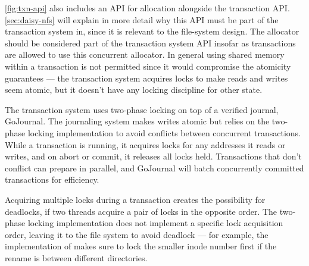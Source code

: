 \autoref{fig:txn-api} also includes an API for allocation alongside the
transaction API. \autoref{sec:daisy-nfs} will explain in more detail why this
API must be part of the transaction system in, since it is relevant to the
file-system design. The allocator should be considered part of the transaction
system API insofar as transactions are allowed to use this concurrent allocator.
In general using shared memory within a transaction is not permitted since it
would compromise the atomicity guarantees --- the transaction system acquires
locks to make reads and writes seem atomic, but it doesn't have any locking
discipline for other state.



The transaction system uses two-phase locking on top of a verified journal,
GoJournal. The journaling system makes writes atomic but relies on the two-phase
locking implementation to avoid conflicts between concurrent transactions.
While a transaction is running, it acquires locks for
any addresses it reads or writes, and on abort or commit, it releases
all locks held. Transactions that don't conflict can prepare in
parallel, and GoJournal will batch concurrently committed
transactions for efficiency.

Acquiring multiple locks during a transaction creates the possibility
for deadlocks, if two threads acquire a pair of locks in the opposite
order. The two-phase locking implementation does not implement a
specific lock acquisition order, leaving it to the file system to
avoid deadlock --- for example, the implementation of 
makes sure to lock the smaller inode number first if the rename is
between different directories.
